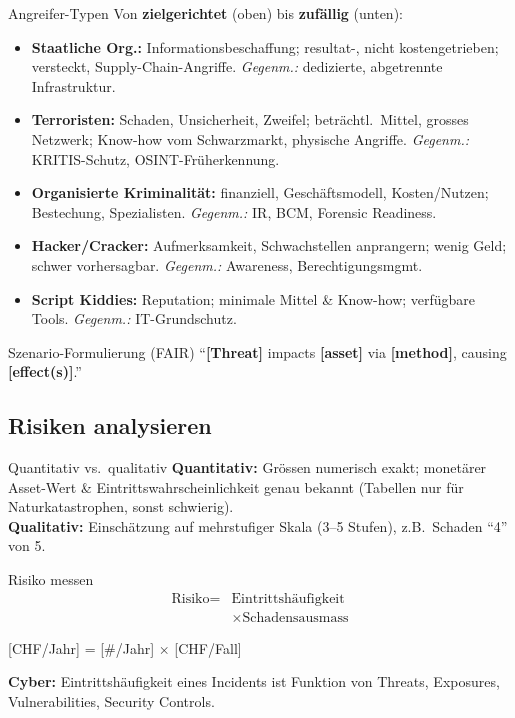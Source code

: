 \documentclass[a4paper, fontsize=7pt]{scrartcl}
\begin{document}
\begin{mainbox}{Angreifer-Typen}
Von \textbf{zielgerichtet} (oben) bis \textbf{zufällig} (unten):
\begin{itemize}
    \item \textbf{Staatliche Org.:} Informationsbeschaffung; resultat-, nicht
          kostengetrieben; versteckt, Supply-Chain-Angriffe.
          \emph{Gegenm.:} dedizierte, abgetrennte Infrastruktur.
    \item \textbf{Terroristen:} Schaden, Unsicherheit, Zweifel; beträchtl.\
          Mittel, grosses Netzwerk; Know-how vom Schwarzmarkt, physische
          Angriffe. \emph{Gegenm.:} KRITIS-Schutz, OSINT-Früherkennung.
    \item \textbf{Organisierte Kriminalität:} finanziell, Geschäftsmodell,
          Kosten/Nutzen; Bestechung, Spezialisten.
          \emph{Gegenm.:} IR, BCM, Forensic Readiness.
    \item \textbf{Hacker/Cracker:} Aufmerksamkeit, Schwachstellen
          anprangern; wenig Geld; schwer vorhersagbar.
          \emph{Gegenm.:} Awareness, Berechtigungsmgmt.
    \item \textbf{Script Kiddies:} Reputation; minimale Mittel \& Know-how;
          verfügbare Tools. \emph{Gegenm.:} IT-Grundschutz.
\end{itemize}
\end{mainbox}

\begin{mainbox}{Szenario-Formulierung (FAIR)}
``\textbf{[Threat]} impacts \textbf{[asset]} via \textbf{[method]}, causing
\textbf{[effect(s)]}.''
\end{mainbox}

\subsection{Risiken analysieren}

\begin{mainbox}{Quantitativ vs.\ qualitativ}
\textbf{Quantitativ:} Grössen numerisch exakt; monetärer Asset-Wert \&
Eintrittswahrscheinlichkeit genau bekannt (Tabellen nur für
Naturkatastrophen, sonst schwierig).\\
\textbf{Qualitativ:} Einschätzung auf mehrstufiger Skala (3--5 Stufen),
z.B.\ Schaden ``4'' von 5.
\end{mainbox}

\begin{mainbox}{Risiko messen}
$$\boxed{\begin{aligned}\text{Risiko} = {} & \text{Eintrittshäufigkeit}\\ & \times \text{Schadensausmass}\end{aligned}}$$
\vspace{-6pt}
\begin{center}
[CHF/Jahr] = [\#/Jahr] $\times$ [CHF/Fall]
\end{center}
\textbf{Cyber:} Eintrittshäufigkeit eines Incidents ist Funktion von
Threats, Exposures, Vulnerabilities, Security Controls.
\end{mainbox}
\end{document}
